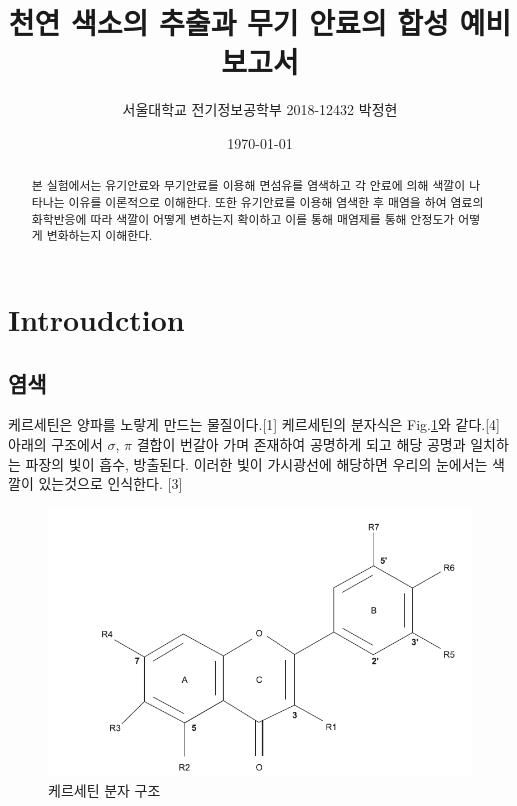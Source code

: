 \documentclass[%
 reprint,
 amsmath,amssymb,
 aps,
]{revtex4-2}
\begin{document}
\title{천연 색소의 추출과 무기 안료의 합성 예비보고서}

\author{서울대학교 전기정보공학부 2018-12432 박정현}
\date{\today}%

\begin{abstract}
본 실험에서는 유기안료와 무기안료를 이용해 면섬유를 염색하고 각 안료에 의해 색깔이 나타나는 이유를 이론적으로 이해한다. 또한 유기안료를 이용해 염색한 후 매염을 하여 염료의 화학반응에 따라 색깔이 어떻게 변하는지 확이하고 이를 통해 매염제를 통해 안정도가 어떻게 변화하는지 이해한다.
\end{abstract}

\maketitle


\section{\label{sec:level1}Introudction}
\subsection{\label{sec:level2}염색}
케르세틴은 양파를 노랗게 만드는 물질이다.[1] 케르세틴의 분자식은 Fig.\ref{fig:Que}와 같다.[4] 아래의 구조에서 $\sigma$, $\pi$ 결합이 번갈아 가며 존재하여 공명하게 되고 해당 공명과 일치하는 파장의 빛이 흡수, 방출된다. 이러한 빛이 가시광선에 해당하면 우리의 눈에서는 색깔이 있는것으로 인식한다. [3]
\begin{figure}[htbp]
	\includegraphics[width = 0.6\linewidth]{Que.png}%
	\caption{\label{fig:Que}케르세틴 분자 구조}
\end{figure}
\end{document}
